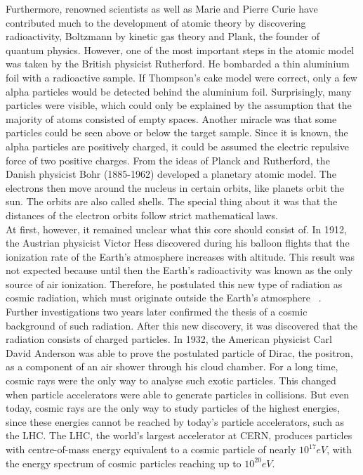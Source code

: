 Furthermore, renowned scientists as well as Marie and Pierre Curie have contributed much to the development of atomic theory by discovering radioactivity, Boltzmann by kinetic gas theory and Plank, the founder of quantum physics.
However, one of the most important steps in the atomic model was taken by the British physicist Rutherford. He bombarded a thin aluminium foil with a radioactive sample. If Thompson's cake model were correct, only a few alpha particles would be detected behind the aluminium foil. Surprisingly, many particles were visible, which could only be explained by the assumption that the majority of atoms consisted of empty spaces. Another miracle was that some particles could be seen above or below the target sample. Since it is known, the alpha particles are positively charged, it could be assumed the electric repulsive force of two positive charges. From the ideas of Planck and Rutherford, the Danish physicist Bohr (1885-1962) developed a planetary atomic model. The electrons then move around the nucleus in certain orbits, like planets orbit the sun. The orbits are also called shells. The special thing about it was that the distances of the electron orbits follow strict mathematical laws.\\  
At first, however, it remained unclear what this core should consist of. \cite{haken2013atom, demtroder2005experimentalphysik}   
In 1912, the Austrian physicist Victor Hess discovered during his balloon flights that the ionization rate of the Earth's atmosphere increases with altitude. This result was not expected because until then the Earth's radioactivity was known as the only source of air ionization. Therefore, he postulated this new type of radiation as cosmic radiation, which must originate outside the Earth's atmosphere ~\cite{Ender}.\\
Further investigations two years later confirmed the thesis of a cosmic background of such radiation. After this new discovery, it was discovered that the radiation consists of charged particles. In 1932, the American physicist Carl David Anderson was able to prove the postulated particle of Dirac, the positron, as a component of an air shower through his cloud chamber. For a long time, cosmic rays were the only way to analyse such exotic particles.\cite{Bluemer:2009zf}
This changed when particle accelerators were able to generate particles in collisions. But even today, cosmic rays are the only way to study particles of the highest energies, since these energies cannot be reached by today's particle accelerators, such as the LHC. The LHC, the world's largest accelerator at CERN, produces particles with centre-of-mass energy equivalent to a cosmic particle of nearly $10^{17} eV $, with the energy spectrum of cosmic particles reaching up to $10^{20} eV $.
